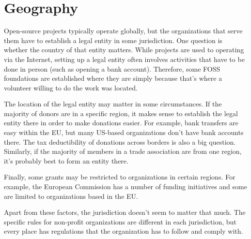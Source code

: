 


\chapter{Geography}

Open-source projects typically operate globally, but the organizations that serve them have to establish a legal entity in some jurisdiction.  One question is whether the country of that entity matters.  While projects are used to operating via the Internet, setting up a legal entity often involves activities that have to be done in person (such as opening a bank account).  Therefore, some FOSS foundations are established where they are simply because that's where a volunteer willing to do the work was located.

The location of the legal entity may matter in some circumstances.  If the majority of donors are in a specific region, it makes sense to establish the legal entity there in order to make donations easier.  For example, bank transfers are easy within the EU, but many US-based organizations don't have bank accounts there.  The tax deductibility of donations across borders is also a big question.  Similarly, if the majority of members in a trade association are from one region, it's probably best to form an entity there.

Finally, some grants may be restricted to organizations in certain regions.  For example, the European Commission has a number of funding initiatives and some are limited to organizations based in the EU.

Apart from these factors, the jurisdiction doesn't seem to matter that much.  The specific rules for non-profit organizations are different in each jurisdiction, but every place has regulations that the organization has to follow and comply with.

